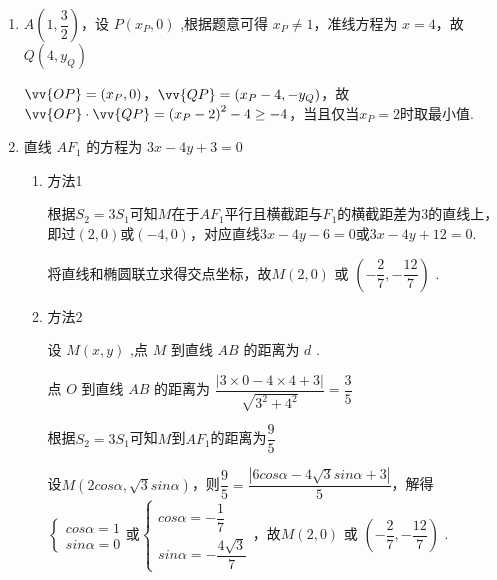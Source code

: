 \begin{enumerate}
\begin{jieda}
\begin{enumerate}
        由椭圆定义可得: $\left| {A{F}_{1}}\right|  + \left| {A{F}_{2}}\right|  = 4$，因此$\bigtriangleup A{F}_{1}{F}_{2}$ 的周长为 $4 + 2 = 6$
        \item $A\left( {1,\dfrac{3}{2}}\right)$，设 $P\left( {{x}_P,0}\right)$ ,根据题意可得 ${x}_P \neq  1$，准线方程为 $x = 4$，故$Q\left( {4,{y}_{Q}}\right)$

        $\vv{OP} = (x_P, 0)$，$\vv{QP} = (x_P-4, -y_Q)$，故$\vv{OP} \cdot  \vv{QP} = {\left( {x}_P - 2\right) }^{2} - 4 \geq   - 4$，当且仅当$x_P = 2$时取最小值.

        \item 直线 $A{F}_{1}$ 的方程为 ${3x} - {4y} + 3 = 0$
        \begin{enumerate}
            \item 方法1 

            根据${S}_{2} = 3{S}_{1}$可知$M$在于$AF_1$平行且横截距与$F_1$的横截距差为$3$的直线上，即过$(2, 0)$或$(-4, 0)$，对应直线${3x} - {4y} -6 = 0$或$3x-4y+12=0$.

            将直线和椭圆联立求得交点坐标，故$M\left( {2,0}\right)$ 或 $\left( {-\dfrac{2}{7}, - \dfrac{12}{7}}\right)$ .

            \item 方法2

            设 $M\left( {x,y}\right)$ ,点 $M$ 到直线 ${AB}$ 的距离为 $d$ .
    
            点 $O$ 到直线 ${AB}$ 的距离为 $\dfrac{\left| 3 \times  0 - 4 \times  4 + 3\right| }{\sqrt{{3}^{2} + {4}^{2}}} = \dfrac{3}{5}$
            
            根据${S}_{2} = 3{S}_{1}$可知$M$到$AF_1$的距离为$\dfrac{9}{5}$
    
            设$M(2cos\alpha, \sqrt{3}sin\alpha)$，则$\dfrac{9}{5} = \dfrac{|6cos\alpha-4\sqrt{3}sin\alpha+3|}{5}$，解得$\left\{\begin{array}{l}
                 cos\alpha = 1  \\
                 sin\alpha = 0
            \end{array}\right.$或$\left\{\begin{array}{l}
                 cos\alpha = -\dfrac{1}{7}  \\
                 sin\alpha = -\dfrac{4\sqrt{3}}{7}
            \end{array}\right.$，故$M\left( {2,0}\right)$ 或 $\left( {-\dfrac{2}{7}, - \dfrac{12}{7}}\right)$ .
        \end{enumerate}
    \end{enumerate}
    \end{jieda}
\end{enumerate}

